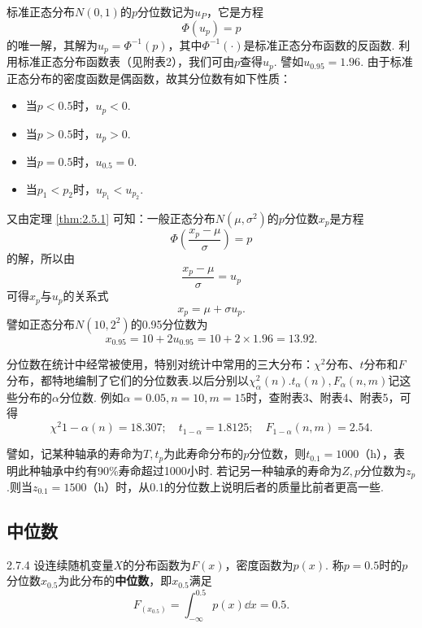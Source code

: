 \begin{example}
  标准正态分布$N(0,1)$的$p$分位数记为$u_P$，它是方程
  \[
    \varPhi(u_p) = p
  \]
  的唯一解，其解为$u_p=\varPhi^{-1}(p)$，其中$\varPhi^{-1}(\cdot)$是标准正态分布函数的反函数. 利用标准正态分布函数表（见附表2），我们可由$p$查得$u_p$. 譬如$u_{0.95}=1.96$. 由于标准正态分布的密度函数是偶函数，故其分位数有如下性质：

  \begin{itemize}
    \item 当$p<0.5$时，$u_p<0$.

    \item 当$p>0.5$时，$u_p>0$.

    \item 当$p=0.5$时，$u_{0.5}=0$.

    \item 当$p_1<p_2$时，$u_{p_1}<u_{p_2}$.
  \end{itemize}

  又由定理 \ref{thm:2.5.1} 可知：一般正态分布$N(\mu,\sigma^2)$的$p$分位数$x_p$是方程
  \[
    \varPhi\left( \frac{x_p-\mu}\sigma \right) = p
  \]
  的解，所以由
  \[
    \frac{x_p-\mu}\sigma = u_p
  \]
  可得$x_p$与$u_p$的关系式
  \begin{equation}\label{eq2.7.7}
    x_p = \mu + \sigma u_p.
  \end{equation}
  譬如正态分布$N(10,2^2)$的0.95分位数为
  \[
    x_{0.95} = 10 + 2u_{0.95} = 10 + 2\times 1.96 = 13.92.
  \]
\end{example}

分位数在统计中经常被使用，特别对统计中常用的三大分布：$\chi^2$分布、$t$分布和$F$分布，都特地编制了它们的分位数表.以后分别以$\chi^2_\alpha(n).t_\alpha(n),F_\alpha(n,m)$记这些分布的$\alpha$分位数. 例如$\alpha=0.05,n=10,m=15$时，查附表3、附表4、附表5，可得
\[
  \chi^2{1-\alpha}(n) = 18.307;\quad t_{1-\alpha} = 1.8125;\quad F_{1-\alpha} (n,m) = 2.54.
\]

譬如，记某种轴承的寿命为$T,t_p$为此寿命分布的$p$分位数，则$t_{0.1}=1000$（h），表明此种轴承中约有90\%寿命超过1000小时. 若记另一种轴承的寿命为$Z,p$分位数为$z_p$.则当$z_{0.1}=1500$（h）时，从0.1的分位数上说明后者的质量比前者更高一些.

\subsection{中位数}
\begin{definition}{}{2.7.4}
  设连续随机变量$X$的分布函数为$F(x)$，密度函数为$p(x)$.
称$p=0.5$时的$p$分位数$x_{0.5}$为此分布的\textbf{中位数}，即$x_{0.5}$满足
\begin{equation}\label{eq2.7.8}
  F_(x_{0.5}) = \int_{-\infty}^{0.5} p(x) \dd x = 0.5.
\end{equation}
\end{definition}

